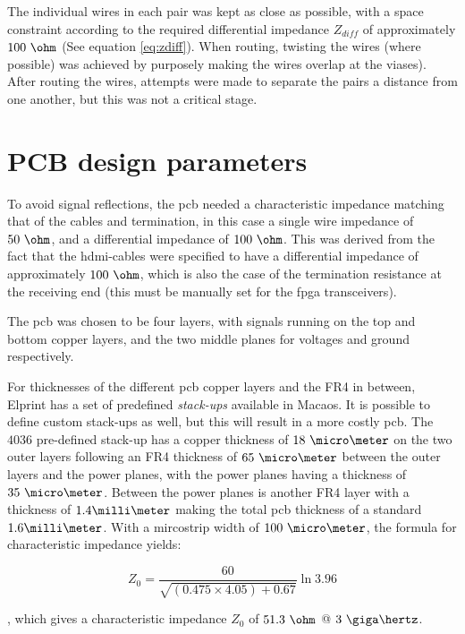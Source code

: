 \documentclass[main.tex]{subfiles}
\begin{document}
The individual wires in each pair was kept as close as possible, with a space constraint according to the required differential impedance $Z_{diff}$ of approximately $100\ \ohm$ (See equation \ref{eq:zdiff}). When routing, twisting the wires (where possible) was achieved by purposely making the wires overlap at the viases). After routing the wires, attempts were made to separate the pairs a distance from one another, but this was not a critical stage.

\section{PCB design parameters}

To avoid signal reflections, the \gls{pcb} needed a characteristic impedance matching that of the cables and termination, in this case a single wire impedance of $50\ \ohm$, and a differential impedance of $100\ \ohm$. This was derived from the fact that the \gls{hdmi}-cables were specified to have a differential impedance of approximately $100\ \ohm$, which is also the case of the termination resistance at the receiving end (this must be manually set for the \gls{fpga} transceivers).

The \gls{pcb} was chosen to be four layers, with signals running on the top and bottom copper layers, and the two middle planes for voltages and ground respectively.

For thicknesses of the different \gls{pcb} copper layers and the FR4 in between, Elprint has a set of predefined \textit{stack-ups} available in Macaos. It is possible to define custom stack-ups as well, but this will result in a more costly \gls{pcb}. The $4036$ pre-defined stack-up has a copper thickness of $18\ \micro\meter$ on the two outer layers following an FR4 thickness of $65\ \micro\meter$ between the outer layers and the power planes, with the power planes having a thickness of $35\ \micro\meter$. Between the power planes is another FR4 layer with a thickness of $1.4 \milli\meter$ making the total \gls{pcb} thickness of a standard $1.6 \milli\meter$. With a mircostrip width of $100\ \micro\meter$, the formula for characteristic impedance yields:

\begin{equation}
Z_0 = \frac{60}{\sqrt{(0.475 \times 4.05) + 0.67}}\ln{3.96}
\end{equation}

, which gives a characteristic impedance $Z_0$ of $51.3\ \ohm$ @ $3\ \giga\hertz$. 
\end{document}
